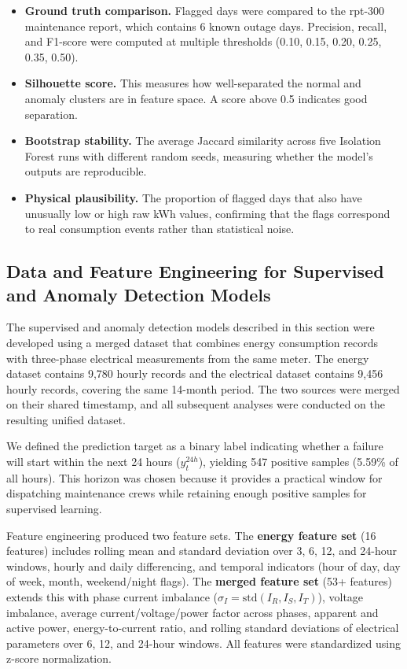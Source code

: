 \documentclass{article}
\begin{document}
\begin{itemize}
    \item \textbf{Ground truth comparison.} Flagged days were compared to the rpt-300 maintenance report, which contains 6 known outage days. Precision, recall, and F1-score were computed at multiple thresholds (0.10, 0.15, 0.20, 0.25, 0.35, 0.50).
    \item \textbf{Silhouette score.} This measures how well-separated the normal and anomaly clusters are in feature space. A score above 0.5 indicates good separation.
    \item \textbf{Bootstrap stability.} The average Jaccard similarity across five Isolation Forest runs with different random seeds, measuring whether the model's outputs are reproducible.
    \item \textbf{Physical plausibility.} The proportion of flagged days that also have unusually low or high raw kWh values, confirming that the flags correspond to real consumption events rather than statistical noise.
\end{itemize}


\subsection{Data and Feature Engineering for Supervised and Anomaly Detection Models}

The supervised and anomaly detection models described in this section were developed using a merged dataset that combines energy consumption records with three-phase electrical measurements from the same meter. The energy dataset contains 9,780 hourly records and the electrical dataset contains 9,456 hourly records, covering the same 14-month period. The two sources were merged on their shared timestamp, and all subsequent analyses were conducted on the resulting unified dataset.

We defined the prediction target as a binary label indicating whether a failure will start within the next 24 hours ($y^{24h}_t$), yielding 547 positive samples (5.59\% of all hours). This horizon was chosen because it provides a practical window for dispatching maintenance crews while retaining enough positive samples for supervised learning.

Feature engineering produced two feature sets. The \textbf{energy feature set} (16 features) includes rolling mean and standard deviation over 3, 6, 12, and 24-hour windows, hourly and daily differencing, and temporal indicators (hour of day, day of week, month, weekend/night flags). The \textbf{merged feature set} (53+ features) extends this with phase current imbalance ($\sigma_I = \text{std}(I_R, I_S, I_T)$), voltage imbalance, average current/voltage/power factor across phases, apparent and active power, energy-to-current ratio, and rolling standard deviations of electrical parameters over 6, 12, and 24-hour windows. All features were standardized using z-score normalization.
\end{document}
